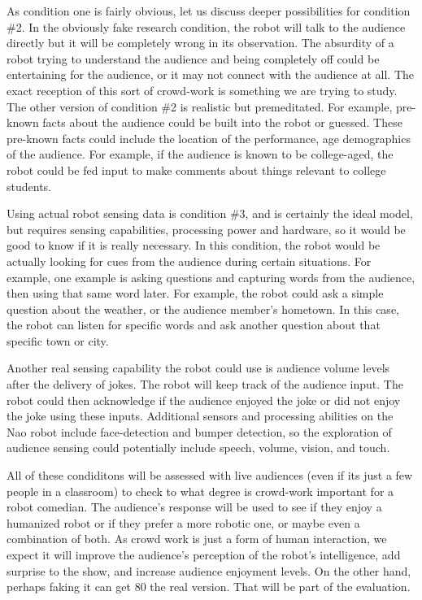 \documentclass[onecolumn, draftclsnofoot,10pt, compsoc]{IEEEtran}
\begin{document}
As condition one is fairly obvious, let us discuss deeper possibilities for condition \#2. In the obviously fake research
condition, the robot will talk to the audience directly but it will be completely wrong in its observation. The absurdity
of a robot trying to understand the audience and being completely off could be entertaining for the audience, or it may
not connect with the audience at all. The exact reception of this sort of crowd-work is something we are trying to study.
The other version of condition \#2 is realistic but premeditated. For example, pre-known facts about the audience
could be built into the robot or guessed. These pre-known facts could include the location of the performance, age
demographics of the audience. For example, if the audience is known to be college-aged, the robot could be fed input
to make comments about things relevant to college students.

Using actual robot sensing data is condition \#3, and is certainly the ideal model, but requires sensing capabilities,
processing power and hardware, so it would be good to know if it is really necessary. In this condition, the robot would
be actually looking for cues from the audience during certain situations. For example, one example is asking questions
and capturing words from the audience, then using that same word later. For example, the robot could ask a simple
question about the weather, or the audience member’s hometown. In this case, the robot can listen for specific words
and ask another question about that specific town or city.

Another real sensing capability the robot could use is audience volume levels after the delivery of jokes. The robot
will keep track of the audience input. The robot could then acknowledge if the audience enjoyed the joke or did not
enjoy the joke using these inputs. Additional sensors and processing abilities on the Nao robot include face-detection
and bumper detection, so the exploration of audience sensing could potentially include speech, volume, vision, and
touch.

All of these condiditons will be assessed with live audiences (even if its just a few people in a classroom) to check to
what degree is crowd-work important for a robot comedian. The audience’s response will be used to see if they enjoy
a humanized robot or if they prefer a more robotic one, or maybe even a combination of both. As crowd work is just a
form of human interaction, we expect it will improve the audience’s perception of the robot’s intelligence, add surprise
to the show, and increase audience enjoyment levels. On the other hand, perhaps faking it can get 80%
the real version. That will be part of the evaluation.
\end{document}

